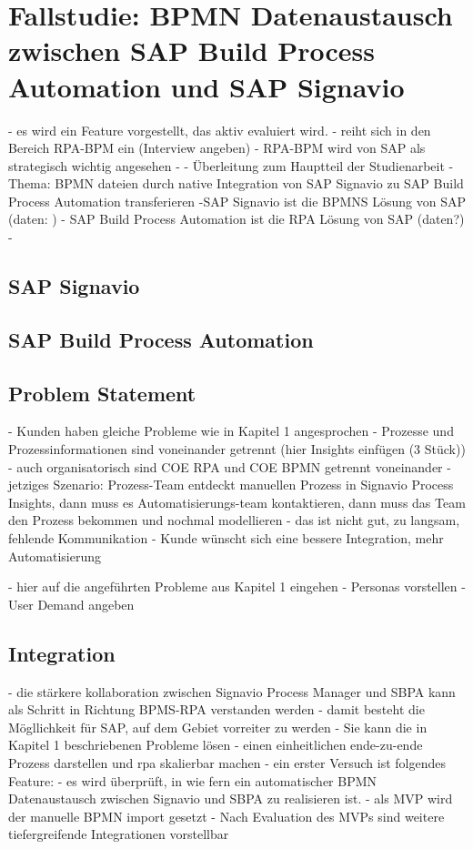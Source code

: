 \chapter{Fallstudie: BPMN Datenaustausch zwischen SAP Build Process Automation und SAP Signavio}
    - es wird ein Feature vorgestellt, das aktiv evaluiert wird.
    - reiht sich in den Bereich RPA-BPM ein (Interview angeben)
    - RPA-BPM wird von SAP als strategisch wichtig angesehen
    - 
    - Überleitung zum Hauptteil der Studienarbeit
    - Thema: BPMN dateien durch native Integration von SAP Signavio zu SAP Build Process Automation transferieren
    -SAP Signavio ist die BPMNS Lösung von SAP (daten: )
    - SAP Build Process Automation ist die RPA Lösung von SAP (daten?)
    - 
\section{SAP Signavio}
\section{SAP Build Process Automation}

\section{Problem Statement}
    - Kunden haben gleiche Probleme wie in Kapitel 1 angesprochen
        - Prozesse und Prozessinformationen sind voneinander getrennt (hier Insights einfügen (3 Stück))
    - auch organisatorisch sind COE RPA und COE BPMN getrennt voneinander
    - jetziges Szenario: Prozess-Team entdeckt manuellen Prozess in Signavio Process Insights, dann muss es Automatisierungs-team kontaktieren, dann muss das Team den Prozess bekommen und nochmal modellieren
    - das ist nicht gut, zu langsam, fehlende Kommunikation
    - Kunde wünscht sich eine bessere Integration, mehr Automatisierung

    - hier auf die angeführten Probleme aus Kapitel 1 eingehen
    - Personas vorstellen
    - User Demand angeben


   \section{Integration}
   - die stärkere kollaboration zwischen Signavio Process Manager und SBPA kann als Schritt in Richtung BPMS-RPA verstanden werden
   - damit besteht die Mögllichkeit für SAP, auf dem Gebiet vorreiter zu werden
   - Sie kann die in Kapitel 1 beschriebenen Probleme lösen
   - einen einheitlichen ende-zu-ende Prozess darstellen und rpa skalierbar machen
   - ein erster Versuch ist folgendes Feature:
   - es wird überprüft, in wie fern ein automatischer BPMN Datenaustausch zwischen Signavio und SBPA zu realisieren ist.
   - als MVP wird der manuelle BPMN import gesetzt
   - Nach Evaluation des MVPs sind weitere tiefergreifende Integrationen vorstellbar

